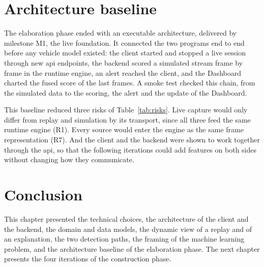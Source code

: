 \section{Architecture baseline}
\label{sec:baseline}

The elaboration phase ended with an executable architecture, delivered by milestone M1, the live foundation. It connected the two programs end to end before any vehicle model existed: the client started and stopped a live session through new \gls{api} endpoints, the backend scored a simulated stream frame by frame in the runtime engine, an alert reached the client, and the Dashboard charted the fused score of the last frames. A smoke test checked this chain, from the simulated data to the scoring, the alert and the update of the Dashboard.

This baseline reduced three risks of Table~\ref{tab:risks}. Live capture would only differ from replay and simulation by its transport, since all three feed the same runtime engine (R1). Every source would enter the engine as the same frame representation (R7). And the client and the backend were shown to work together through the \gls{api}, so that the following iterations could add features on both sides without changing how they communicate.

\section*{Conclusion}

This chapter presented the technical choices, the architecture of the client and the backend, the domain and data models, the dynamic view of a replay and of an explanation, the two detection paths, the framing of the machine learning problem, and the architecture baseline of the elaboration phase. The next chapter presents the four iterations of the construction phase.
